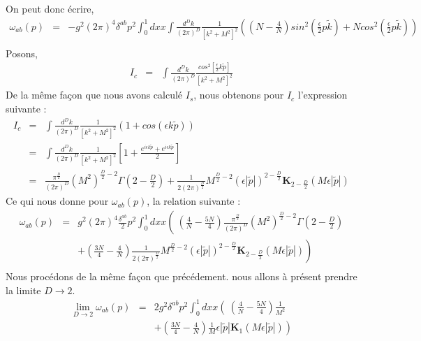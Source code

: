 \documentclass[a4paper,11pt]{article}
\theoremstyle{plain}
\theoremstyle{definition}
\theoremstyle{remark}
\numberwithin{equation}{section}
\numberwithin{equation}{subsection}
\numberwithin{figure}{section}
\begin{document}
\noindent
On peut donc écrire,
 \begin{eqnarray}
  \omega_{ab}(p) &=& - g^{2}  (2 \pi)^{4} \delta^{ab}  p^{2}
\int_{0}^{1}  dx  x
\int  \frac{d^D k}{(2 \pi)^D}
\frac{1}{ [k^2 + M^2 ]^2}
\left(
\left( N-\frac{4}{N} \right)  sin^{2} \left(  \frac{\epsilon}{2}  p \tilde{k}   \right)
+ N cos^{2} \left(  \frac{\epsilon}{2}  p \tilde{k}   \right)
\right)  \\
\end{eqnarray}
Posons,
\begin{eqnarray}
 I_{c} &=& \int  \frac{d^D k}{(2 \pi)^D}
\frac{cos^2 \left[ \frac{\epsilon}{2} k \tilde{p} \right] }{\left[ k^2  +  M^2  \right]^2}
\end{eqnarray}
De la même façon que nous avons calculé $I_{s}$, nous obtenons pour $I_{c}$ l'expression suivante :
\begin{eqnarray}
 I_{c} &=& \int  \frac{d^D k}{(2 \pi)^D}
\frac{1}{\left[ k^2  +  M^2 \right]^2} 
 \left( 1 + cos ( \epsilon k \tilde{p} ) \right) \\
          &=&  \int  \frac{d^D k}{(2 \pi)^D}
\frac{1 }{\left[ k^2  +  M^2 \right]^2} 
 \left[ 1 + \frac{e^{ i \epsilon k \tilde{p} }   +   e^{i \epsilon k \tilde{p} } }{ 2 }  \right] \\
          &=& \frac{ \pi^{\frac{D}{2}} }{ (2 \pi)^{D}  }  (M^2)^{\frac{D}{2}-2} \Gamma(2-\frac{D}{2})
+  \frac{1}{2 (2 \pi )^{\frac{D}{2}}}  M^{\frac{D}{2} - 2}  \left( \epsilon \left| \tilde{p}  \right|  \right)^{ 2-\frac{D}{2} }   \textbf{K}_{2- \frac{D}{2}  } ( M \epsilon  \left| \tilde{p}  \right|  )
\end{eqnarray}
Ce qui nous donne pour $  \omega_{ab}(p)$, la relation suivante :
\begin{eqnarray}
 \omega_{ab}(p) &=&  g^{2}  (2 \pi)^{4}  \frac{\delta^{ab}}{2} p^2
\int_{0}^{1}  dx x
\left( \
\left( \frac{4}{N}  -  \frac{5N}{4}  \right)   \frac{ \pi^{\frac{D}{2}} }{ (2 \pi)^{D}  }  (M^2)^{\frac{D}{2}-2} 
\Gamma(2-\frac{D}{2})  \right. \nonumber \\
&&  \left.   + \left( \frac{3N}{4}  - \frac{4}{N}   \right) \frac{1}{2 (2 \pi )^{ \frac{D}{2}}}  M^{\frac{D}{2} - 2} 
\left( \epsilon  \left| \tilde{p}  \right| \right)^{ 2-\frac{D}{2} }   \textbf{K}_{2- \frac{D}{2}  } ( M \epsilon  \left| \tilde{p}  \right|  )
 \right)  \\
 \end{eqnarray}
Nous procédons de la même façon que précédement. nous allons à présent prendre la limite $D \to 2$.
 \begin{eqnarray}
  \lim\limits_{D \to 2} \omega_{ab}(p) &=& 2 g^{2}  \delta^{ab} p^2
\int_{0}^{1}  dx x
\left( \
\left( \frac{4}{N}  -  \frac{5N}{4}  \right)  \frac{1}{M^2}  \right. \\
&&  \left.   + \left( \frac{3N}{4}  - \frac{4}{N}   \right)  \frac{1}{M}  \epsilon \left| \tilde{p}  \right|   \textbf{K}_{1 } ( M \epsilon \left| \tilde{p}  \right|  )
 \right)  \\
 \end{eqnarray}
\end{document}
